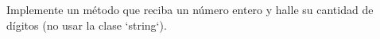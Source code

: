 Implemente un método que reciba un número entero y halle su cantidad de dígitos (no usar la clase `string`).
